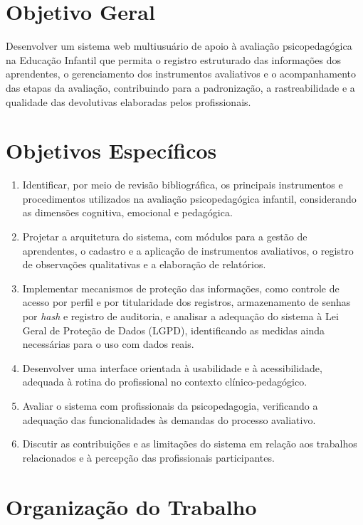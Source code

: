 \section{Objetivo Geral}

Desenvolver um sistema web multiusuário de apoio à avaliação psicopedagógica na Educação Infantil que permita o registro estruturado das informações dos aprendentes, o gerenciamento dos instrumentos avaliativos e o acompanhamento das etapas da avaliação, contribuindo para a padronização, a rastreabilidade e a qualidade das devolutivas elaboradas pelos profissionais.

\section{Objetivos Específicos}

\begin{enumerate}
    \item Identificar, por meio de revisão bibliográfica, os principais instrumentos e procedimentos utilizados na avaliação psicopedagógica infantil, considerando as dimensões cognitiva, emocional e pedagógica.
    \item Projetar a arquitetura do sistema, com módulos para a gestão de aprendentes, o cadastro e a aplicação de instrumentos avaliativos, o registro de observações qualitativas e a elaboração de relatórios.
    \item Implementar mecanismos de proteção das informações, como controle de acesso por perfil e por titularidade dos registros, armazenamento de senhas por \textit{hash} e registro de auditoria, e analisar a adequação do sistema à Lei Geral de Proteção de Dados (LGPD), identificando as medidas ainda necessárias para o uso com dados reais.
    \item Desenvolver uma interface orientada à usabilidade e à acessibilidade, adequada à rotina do profissional no contexto clínico-pedagógico.
    \item Avaliar o sistema com profissionais da psicopedagogia, verificando a adequação das funcionalidades às demandas do processo avaliativo.
    \item Discutir as contribuições e as limitações do sistema em relação aos trabalhos relacionados e à percepção das profissionais participantes.
\end{enumerate}

\section{Organização do Trabalho}

